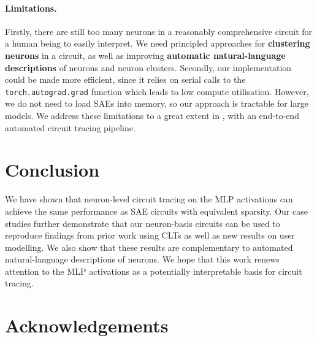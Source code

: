 \documentclass{article}
\theoremstyle{plain}
\theoremstyle{definition}
\theoremstyle{remark}
\begin{document}
\paragraph{Limitations.} Firstly,
there are still too many neurons in a reasonably comprehensive circuit for a human being to easily interpret. We need principled approaches for \textbf{clustering neurons} in a circuit, as well as improving \textbf{automatic natural-language descriptions} of neurons and neuron clusters.
Secondly, our implementation could be made more efficient, since it relies on serial calls to the \texttt{torch.autograd.grad} function which leads to low compute utilisation. 
However, we do not need to load SAEs into memory, so our approach is tractable for large models. We address these limitations to a great extent in \citet{arora2026adag}, with an end-to-end automated circuit tracing pipeline.

\section{Conclusion}

We have shown that neuron-level circuit tracing on the MLP activations can achieve the same performance as SAE circuits with equivalent sparsity. Our case studies further demonstrate that our neuron-basis circuits can be used to reproduce findings from prior work using CLTs \citep{ameisen2025circuit,lindsey2025biology} as well as new results on user modelling. We also show that these results are complementary to automated natural-language descriptions of neurons. We hope that this work renews attention to the MLP activations as a potentially interpretable basis for circuit tracing.

\section*{Acknowledgements}
\end{document}
